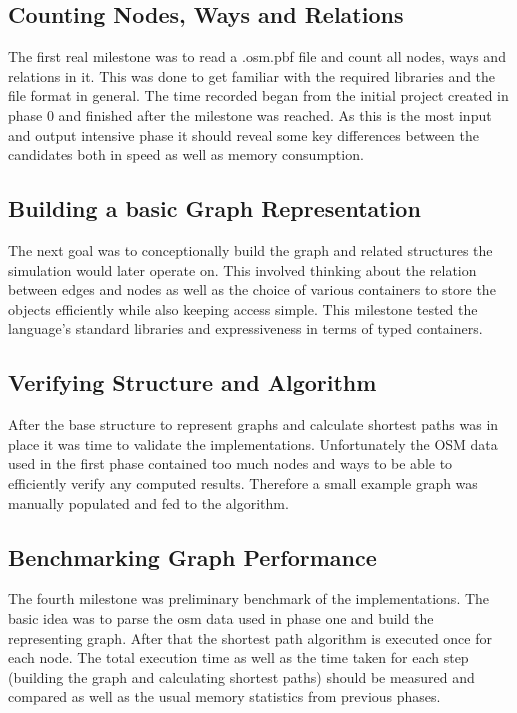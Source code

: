 \subsection*{Counting Nodes, Ways and Relations}
\label{subsec:Concept::Implementation::Counting}

The first real milestone was to read a .osm.pbf file and count all nodes, ways and relations in it. This was done to get familiar with the required libraries and the file format in general. The time recorded began from the initial project created in phase 0 and finished after the milestone was reached. As this is the most input and output intensive phase it should reveal some key differences between the candidates both in speed as well as memory consumption.

\subsection*{Building a basic Graph Representation}
\label{subsec:Concept::Implementation::Graph_Representation}

The next goal was to conceptionally build the graph and related structures the simulation would later operate on. This involved thinking about the relation between edges and nodes as well as the choice of various containers to store the objects efficiently while also keeping access simple. This milestone tested the language's standard libraries and expressiveness in terms of typed containers.

\subsection*{Verifying Structure and Algorithm}
\label{subsec:Concept::Implementation::Verification}

After the base structure to represent graphs and calculate shortest paths was in place it was time to validate the implementations. Unfortunately the OSM data used in the first phase contained too much nodes and ways to be able to efficiently verify any computed results. Therefore a small example graph was manually populated and fed to the algorithm.

\subsection*{Benchmarking Graph Performance}
\label{subsec:Concept::Implementation::SequentialBenchmark}

The fourth milestone was preliminary benchmark of the implementations. The basic idea was to parse the \gls{osm} data used in phase one and build the representing graph. After that the shortest path algorithm is executed once for each node. The total execution time as well as the time taken for each step (building the graph and calculating shortest paths) should be measured and compared as well as the usual memory statistics from previous phases.

